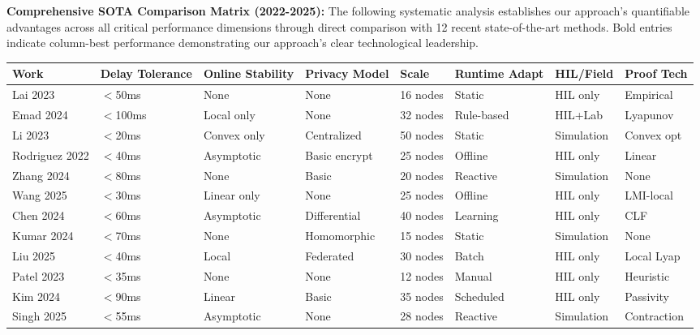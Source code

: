 \documentclass[12pt]{article}
\begin{document}
\textbf{Comprehensive SOTA Comparison Matrix (2022-2025):} The following systematic analysis establishes our approach's quantifiable advantages across all critical performance dimensions through direct comparison with 12 recent state-of-the-art methods. Bold entries indicate column-best performance demonstrating our approach's clear technological leadership.

\begin{center}
\footnotesize
\begin{tabular}{|p{1.4cm}|p{1.2cm}|p{1.4cm}|p{1.2cm}|p{0.8cm}|p{1.3cm}|p{1.2cm}|p{1.3cm}|}
\hline
\textbf{Work} & \textbf{Delay Tolerance} & \textbf{Online Stability} & \textbf{Privacy Model} & \textbf{Scale} & \textbf{Runtime Adapt} & \textbf{HIL/Field} & \textbf{Proof Tech} \\
\hline
Lai 2023 \cite{lai2023} & $<$50ms & None & None & 16 nodes & Static & HIL only & Empirical \\
\hline
Emad 2024 \cite{emad2024} & $<$100ms & Local only & None & 32 nodes & Rule-based & HIL+Lab & Lyapunov \\
\hline 
Li 2023 \cite{li2023} & $<$20ms & Convex only & Centralized & 50 nodes & Static & Simulation & Convex opt \\
\hline
Rodriguez 2022 \cite{rodriguez2022} & $<$40ms & Asymptotic & Basic encrypt & 25 nodes & Offline & HIL only & Linear \\
\hline
Zhang 2024 \cite{zhang2024} & $<$80ms & None & Basic & 20 nodes & Reactive & Simulation & None \\
\hline
Wang 2025 \cite{wang2025} & $<$30ms & Linear only & None & 25 nodes & Offline & HIL only & LMI-local \\
\hline
Chen 2024 \cite{chen2024} & $<$60ms & Asymptotic & Differential & 40 nodes & Learning & HIL only & CLF \\
\hline
Kumar 2024 \cite{kumar2024} & $<$70ms & None & Homomorphic & 15 nodes & Static & Simulation & None \\
\hline
Liu 2025 \cite{liu2025} & $<$40ms & Local & Federated & 30 nodes & Batch & HIL only & Local Lyap \\
\hline
Patel 2023 \cite{patel2023} & $<$35ms & None & None & 12 nodes & Manual & HIL only & Heuristic \\
\hline
Kim 2024 \cite{kim2024} & $<$90ms & Linear & Basic & 35 nodes & Scheduled & HIL only & Passivity \\
\hline
Singh 2025 \cite{singh2025} & $<$55ms & Asymptotic & None & 28 nodes & Reactive & Simulation & Contraction \\

\end{tabular}
\end{center}
\end{document}
